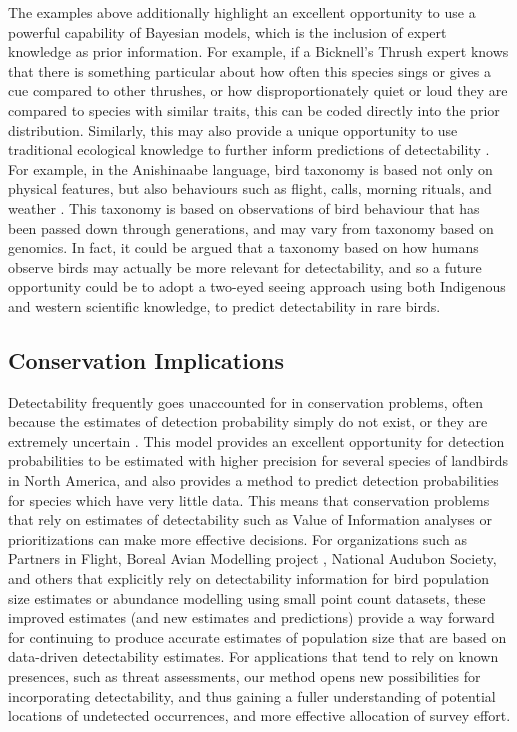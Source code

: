 \documentclass[12pt]{article}
\begin{document}
\par The examples above additionally highlight an excellent opportunity to use a powerful capability of Bayesian models, which is the inclusion of expert knowledge as prior information. 
For example, if a Bicknell’s Thrush expert knows that there is something particular about how often this species sings or gives a cue compared to other thrushes, or how disproportionately quiet or loud they are compared to species with similar traits, this can be coded directly into the prior distribution.
Similarly, this may also provide a unique opportunity to use traditional ecological knowledge to further inform predictions of detectability \citep{wardfear_sharper_2019}.
For example, in the Anishinaabe language, bird taxonomy is based not only on physical features, but also behaviours such as flight, calls, morning rituals, and weather \citep{pitawanakwat_evening_2022}.
This taxonomy is based on observations of bird behaviour that has been passed down through generations, and may vary from taxonomy based on genomics.
In fact, it could be argued that a taxonomy based on how humans observe birds may actually be more relevant for detectability, and so a future opportunity could be to adopt a two-eyed seeing approach \cite{reid_twoeyed_2021} using both Indigenous and western scientific knowledge, to predict detectability in rare birds.

\subsection{Conservation Implications}
\par Detectability frequently goes unaccounted for in conservation problems, often because the estimates of detection probability simply do not exist, or they are extremely uncertain \citep{bennett_how_2024}.
This model provides an excellent opportunity for detection probabilities to be estimated with higher precision for several species of landbirds in North America, and also provides a method to predict detection probabilities for species which have very little data. 
This means that conservation problems that rely on estimates of detectability such as Value of Information analyses \citep{canessa_when_2015, bennett_when_2018} or prioritizations \citep{hanson_prioritizr_2022} can make more effective decisions.
For organizations such as Partners in Flight, Boreal Avian Modelling project \citep{cumming_toward_2010}, National Audubon Society, and others that explicitly rely on detectability information for bird population size estimates or abundance modelling using small point count datasets, these improved estimates (and new estimates and predictions) provide a way forward for continuing to produce accurate estimates of population size that are based on data-driven detectability estimates.
For applications that tend to rely on known presences, such as threat assessments, our method opens new possibilities for incorporating detectability, and thus gaining a fuller understanding of  potential locations of undetected occurrences, and more effective allocation of survey effort.
\end{document}
